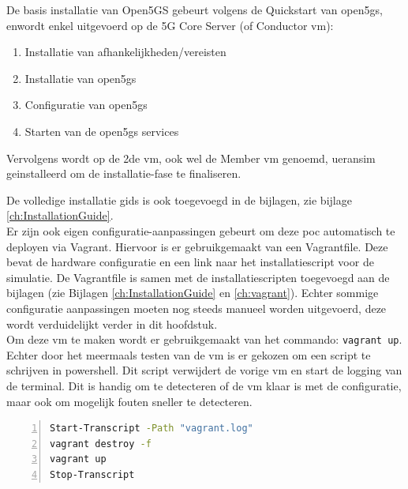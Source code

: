 De basis installatie van Open5GS gebeurt volgens de Quickstart van \gls{open5gs}, \textcite{Lee2025a} enwordt enkel uitgevoerd op de 5G Core Server (of Conductor \gls{vm}):

\begin{enumerate}
    \item Installatie van afhankelijkheden/vereisten
    \item Installatie van \gls{open5gs}
    \item Configuratie van \gls{open5gs}
    \item Starten van de \gls{open5gs} services
\end{enumerate}

Vervolgens wordt op de 2de \gls{vm}, ook wel de Member \gls{vm} genoemd, \gls{ueransim} geinstalleerd om de installatie-fase te finaliseren. 

De volledige installatie gids is ook toegevoegd in de bijlagen, zie bijlage \ref{ch:InstallationGuide}.\\

Er zijn ook eigen configuratie-aanpassingen gebeurt om deze \gls{poc} automatisch te deployen via Vagrant. Hiervoor is er gebruikgemaakt van een Vagrantfile. Deze bevat de hardware configuratie en een link naar het installatiescript voor de simulatie. De Vagrantfile is samen met de installatiescripten toegevoegd aan de bijlagen (zie Bijlagen \ref{ch:InstallationGuide} en \ref{ch:vagrant}). Echter sommige configuratie aanpassingen moeten nog steeds manueel worden uitgevoerd, deze wordt verduidelijkt verder in dit hoofdstuk.\\
Om deze \gls{vm} te maken wordt er gebruikgemaakt van het commando: \lstinline!vagrant up!. Echter door het meermaals testen van de \gls{vm} is er gekozen om een script te schrijven in powershell. Dit script verwijdert de vorige \gls{vm} en start de logging van de terminal. Dit is handig om te detecteren of de \gls{vm} klaar is met de configuratie, maar ook om mogelijk fouten sneller te detecteren.

\begin{lstlisting}[basicstyle=\small, frame=single, breaklines=true, postbreak=\mbox{\textcolor{red}{$\hookrightarrow$}\space}, escapeinside ={\%,}, escapechar={!}, numbers=left, language=sh, caption=Build Script]
Start-Transcript -Path "vagrant.log"
vagrant destroy -f
vagrant up
Stop-Transcript
\end{lstlisting}

\section{}%
\label{sec:Config}%

